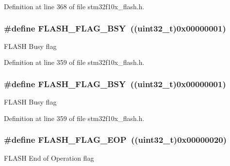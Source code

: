 Definition at line 368 of file stm32f10x\+\_\+flash.\+h.

\subsubsection[{\texorpdfstring{F\+L\+A\+S\+H\+\_\+\+F\+L\+A\+G\+\_\+\+B\+SY}{FLASH_FLAG_BSY}}]{\setlength{\rightskip}{0pt plus 5cm}\#define F\+L\+A\+S\+H\+\_\+\+F\+L\+A\+G\+\_\+\+B\+SY~(({\bf uint32\+\_\+t})0x00000001)}\hypertarget{group___f_l_a_s_h___flags_gad3bc368f954ad7744deda3315da2fff7}{}\label{group___f_l_a_s_h___flags_gad3bc368f954ad7744deda3315da2fff7}
F\+L\+A\+SH Busy flag 

Definition at line 359 of file stm32f10x\+\_\+flash.\+h.

\subsubsection[{\texorpdfstring{F\+L\+A\+S\+H\+\_\+\+F\+L\+A\+G\+\_\+\+B\+SY}{FLASH_FLAG_BSY}}]{\setlength{\rightskip}{0pt plus 5cm}\#define F\+L\+A\+S\+H\+\_\+\+F\+L\+A\+G\+\_\+\+B\+SY~(({\bf uint32\+\_\+t})0x00000001)}\hypertarget{group___f_l_a_s_h___flags_gad3bc368f954ad7744deda3315da2fff7}{}\label{group___f_l_a_s_h___flags_gad3bc368f954ad7744deda3315da2fff7}
F\+L\+A\+SH Busy flag 

Definition at line 359 of file stm32f10x\+\_\+flash.\+h.

\subsubsection[{\texorpdfstring{F\+L\+A\+S\+H\+\_\+\+F\+L\+A\+G\+\_\+\+E\+OP}{FLASH_FLAG_EOP}}]{\setlength{\rightskip}{0pt plus 5cm}\#define F\+L\+A\+S\+H\+\_\+\+F\+L\+A\+G\+\_\+\+E\+OP~(({\bf uint32\+\_\+t})0x00000020)}\hypertarget{group___f_l_a_s_h___flags_gaf043ba4d8f837350bfc7754a99fae5a9}{}\label{group___f_l_a_s_h___flags_gaf043ba4d8f837350bfc7754a99fae5a9}
F\+L\+A\+SH End of Operation flag 

